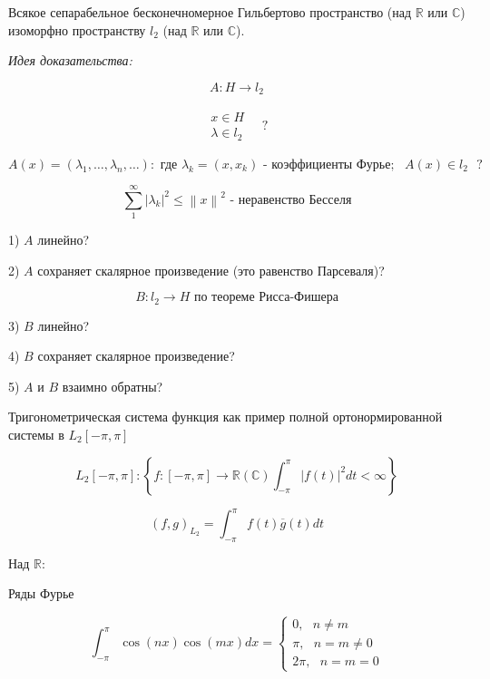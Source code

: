 \documentclass[12pt, a4paper]{report}
\begin{document}
\fi


\begin{theorem}
    Всякое сепарабельное бесконечномерное Гильбертово пространство (над \( \mathbb{R} \) или \( \mathbb{C} \)) изоморфно пространству \( l_2 \)  (над \( \mathbb{R} \) или \( \mathbb{C} \)).
\end{theorem}

\textit{Идея доказательства:} 

\[ A: H \to  l_2 \] 

\[ \begin{aligned}
\begin{aligned}
x \in  H \\ 
\lambda \in  l_2 
\end{aligned}
\quad ?
\end{aligned} \] 

\[ A(x )  = (\lambda_1, \ldots, \lambda_n, \ldots): \text{ где } \lambda_k = (x, x_k ) \text{ - коэффициенты Фурье} ;\text{ } A(x )\in  l_2 \text{  } ?  \] 

\[ \sum_{1} ^{\infty  } \left\lvert \lambda_k        \right\rvert   ^2 \le \left\lVert x  \right\rVert ^2  \text{ - неравенство Бесселя} \] 

1) \( A  \)  линейно? 

2) \( A \) сохраняет скалярное произведение (это равенство Парсеваля)? 

\[ B : l_2 \to  H \text{ по теореме Рисса-Фишера}  \] 

3) \( B  \)  линейно? 

4) \( B \) сохраняет скалярное произведение?

5) \( A \)  и \( B  \)  взаимно обратны?

Тригонометрическая система функция как пример полной ортонормированной системы в \( L_2 [- \pi, \pi] \) 

\[ L_2[-\pi,\pi]:  \left\{ f: [-\pi, \pi ] \to  \mathbb{R}(\mathbb{C} ) \int_{-\pi }^{\pi}|f(t )  | ^2 dt < \infty   \right\}  \] 

\[ (f,g )_{L_2 } = \int_{- \pi }^{\pi} f(t) \overline{g } (t ) dt    \] 

Над \( \mathbb{R} \): 

Ряды Фурье

\[ \int_{- \pi }^{\pi } \cos (nx ) \cos (mx ) dx = \begin{cases}
0 , \text{ } n \neq m \\ 
\pi , \text{ } n = m \neq 0 \\ 
2\pi , \text{ }  n = m = 0
\end{cases}  \] 
\end{document}
